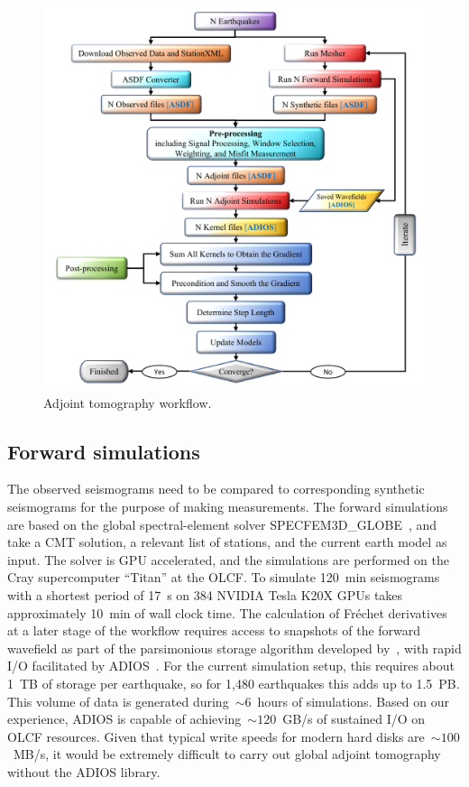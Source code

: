 \documentclass[extra,mreferee]{gji}
\begin{document}
\begin{figure}
  \centering
  \includegraphics[width=\textwidth]{figures/adjoint_workflow_6.pdf}
  \caption{\small{Adjoint tomography workflow.}}
  \label{fig:adjoint_workflow}
\end{figure}

\subsection{Forward simulations}

The observed seismograms need to be compared to corresponding synthetic seismograms
for the purpose of making measurements.
The forward simulations are based on the global spectral-element solver
SPECFEM3D\_GLOBE~\citep{KoTr02a,KoTr02a}, and take a CMT solution, a relevant list
of stations, and the current earth model as input.
The solver is GPU accelerated, and the simulations are performed on the Cray supercomputer ``Titan''
at the OLCF.
To simulate 120~min seismograms with a shortest period of 17~s on 384 NVIDIA
Tesla K20X GPUs takes approximately 10~min of wall clock time.
The calculation of Fr\'echet derivatives at a later stage of the workflow requires
access to snapshots of the forward wavefield as part of the parsimonious storage
algorithm developed by~\cite{KoXiBoPeSaLiTr16},
with rapid I/O facilitated by ADIOS~\citep{liu2014hello}.
For the current simulation setup,
this requires about 1~TB of storage per earthquake,
so for 1,480 earthquakes this adds up to 1.5~PB.
This volume of data is generated during~$\sim6$~hours of simulations.
Based on our experience, ADIOS is capable of achieving~$\sim120$~GB/s
of sustained I/O on OLCF resources.
Given that typical write speeds for modern hard disks are~$\sim100$~MB/s,
it would be extremely difficult to carry out global adjoint tomography without the ADIOS library.
\end{document}

